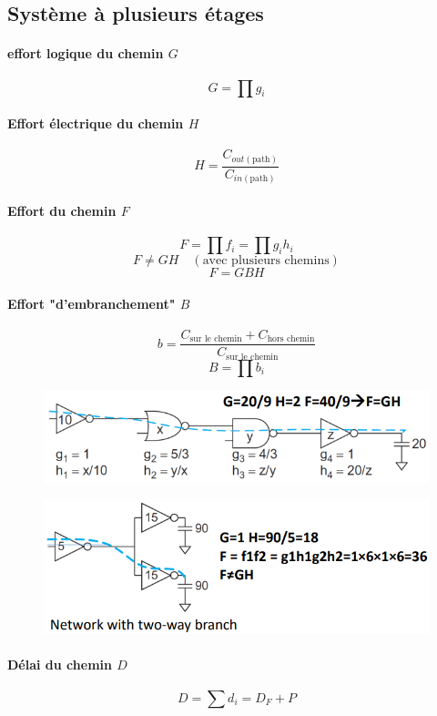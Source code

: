 \documentclass[resume]{subfiles}
\begin{document}
\begin{multicols}{3}
\subsection{Système à plusieurs étages}
\paragraph{effort logique du chemin $G$}
$$G=\prod g_i$$
\paragraph{Effort électrique du chemin $H$}
$$H=\frac{C_{out(\text{path})}}{C_{in(\text{path})}}$$
\paragraph{Effort du chemin $F$}
$$F=\prod f_i=\prod g_ih_i$$
$$F\neq GH\quad (\text{avec plusieurs chemins})$$
$$\boxed{F=GBH}$$
\paragraph{Effort "d'embranchement" $B$}
$$b=\frac{C_{\text{sur le chemin}}+C_{\text{hors chemin}}}{C_{\text{sur le chemin}}}$$
$$B=\prod b_i$$
\begin{figure}[H]
\centering
\includegraphics[width=\columnwidth]{img_48.png}
\end{figure}

\begin{figure}[H]
\centering
\includegraphics[width=\columnwidth]{img_49.png}
\end{figure}
\paragraph{Délai du chemin $D$}
$$D=\sum d_i=D_F+P$$

\end{multicols}
\end{document}

